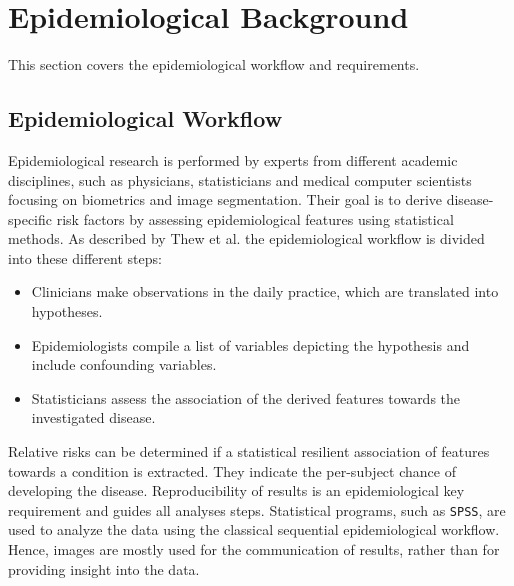 \documentclass[journal]{style/vgtc} 			          %
\begin{document}
\section{Epidemiological Background} \label{sec:Background}
This section covers the epidemiological workflow and requirements.
\subsection{Epidemiological Workflow} \label{EpidemiologicalWorkflow}
Epidemiological research is performed by experts from different academic disciplines, such as physicians, statisticians and medical computer scientists focusing on biometrics and image segmentation.
Their goal is to derive disease-specific risk factors by assessing epidemiological features using statistical methods.
As described by Thew et al. \cite{Thew2009} the epidemiological workflow is divided into these different steps:
\begin{itemize}
	\item Clinicians make observations in the daily practice, which are translated into hypotheses.
	\item Epidemiologists compile a list of variables depicting the hypothesis and include confounding variables.
	\item Statisticians assess the association of the derived features towards the investigated disease.
\end{itemize}
Relative risks can be determined if a statistical resilient association of features towards a condition is extracted.
They indicate the per-subject chance of developing the disease.
Reproducibility of results is an epidemiological key requirement and guides all analyses steps.
Statistical programs, such as \texttt{SPSS}, are used to analyze the data using the classical sequential epidemiological workflow. Hence, images are mostly used for the communication of results, rather than for providing insight into the data.
\end{document}
